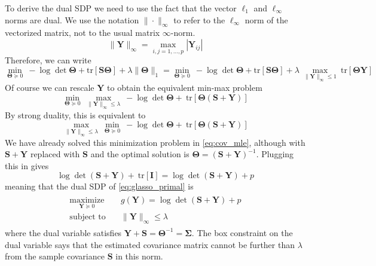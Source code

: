 \documentclass[10pt, letterpaper]{article}
\newcommand{\cov}{\boldsymbol \Sigma}
\newcommand{\preci}{\boldsymbol \Theta}
\newcommand{\tr}[1]{\mathrm{tr}\left[  #1 \right]}
\newcommand{\sampcov}{\boldsymbol S} %
\newcommand{\dualvar}{\boldsymbol Y} %
\newcommand{\eye}{\boldsymbol I} %
\begin{document}
To derive the dual SDP we need to use the fact that the vector $\ell_1$ and $\ell_{\infty}$ norms are dual.  We use the notation $\|\cdot\|_{\infty}$ to refer to the $\ell_{\infty}$ norm of the vectorized matrix, not to the usual matrix $\infty$-norm.
\[
\| \dualvar \|_{\infty} = \max_{i,j=1,\ldots,p} \left| \dualvar_{ij} \right|
\]
Therefore, we can write
\[
\underset{\preci \succeq 0}{\min}\  - \log \det \preci + \tr{\sampcov \preci} + \lambda \|\preci\|_1 
= \underset{\preci \succeq 0}{\min}\  - \log \det \preci + \tr{\sampcov \preci} + \lambda\  \underset{\|  \dualvar \|_{\infty} \le 1}{\max}\ \tr{ \preci \dualvar }
\]
Of course we can rescale $\dualvar$ to obtain the equivalent min-max problem
\[
\underset{\preci \succeq 0}{\min}\  \underset{\|  \dualvar \|_{\infty} \le \lambda }{\max}\  - \log \det \preci + \  \tr{ \preci \left(\sampcov + \dualvar \right) }
\]
By strong duality, this is equivalent to
\[
 \underset{\|  \dualvar \|_{\infty} \le \lambda }{\max}\ \underset{\preci \succeq 0}{\min}\  - \log \det \preci + \  \tr{ \preci \left(\sampcov + \dualvar \right) }
\] 
We have already solved this minimization problem in \ref{eq:cov_mle}, although with $\sampcov + \dualvar$ replaced with $\sampcov$ and the optimal solution is $\preci = \left(  \sampcov + \dualvar \right)^{-1}$.  Plugging this in gives
\[
\log \det  \left(  \sampcov + \dualvar \right)  + \  \tr{ \eye } = \log \det  \left(  \sampcov + \dualvar \right)  + p
\]
meaning that the dual SDP of \ref{eq:glasso_primal} is
\begin{align}
\begin{split}
\underset{\dualvar \succeq 0}{\mathrm{maximize}}\ &g(\dualvar) =  \log \det\left( \sampcov + \dualvar \right) + p\\
\text{subject to}\quad  &\| \dualvar \|_{\infty} \le \lambda
\end{split}
\label{eq:glasso_dual}
\end{align}
where the dual variable satisfies $\dualvar + \sampcov = \preci^{-1} = \cov$.  The box constraint on the dual variable says that the estimated covariance matrix cannot be further than $\lambda$ from the sample covariance $\sampcov$ in this norm.\\
\end{document}
